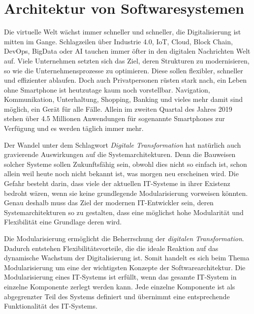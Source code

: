 \chapter{Architektur von Softwaresystemen}
\label{sec:softwarearchitektur}

Die virtuelle Welt wächst immer schneller und schneller, die Digitalisierung ist mitten im Gange. Schlagzeilen über Industrie 4.0, \ac{IoT}, Cloud, Block Chain, \ac{DevOps}, BigData oder \ac{AI} tauchen immer öfter in den digitalen Nachrichten Welt auf. Viele Unternehmen setzten sich das Ziel, deren Strukturen zu modernisieren, so wie die Unternehmensprozesse zu optimieren. Diese sollen flexibler, schneller und effizienter ablaufen. Doch auch Privatpersonen rüsten stark nach, ein Leben ohne Smartphone ist heutzutage kaum noch vorstellbar. Navigation, Kommunikation, Unterhaltung, Shopping, Banking und vieles mehr damit sind möglich, ein Gerät für alle Fälle. Allein im zweiten Quartal des Jahres 2019 stehen über 4.5 Millionen Anwendungen für sogenannte Smartphones zur Verfügung und es werden täglich immer mehr\autocite[Vgl.][]{appstore}.

Der Wandel unter dem Schlagwort \textit{Digitale Transformation} hat natürlich auch gravierende Auswirkungen auf die Systemarchitekturen. Denn die Bauweisen solcher Systeme sollen Zukunftsfähig sein, obwohl dies nicht so einfach ist, schon allein weil heute noch nicht bekannt ist, was morgen neu erscheinen wird. Die Gefahr besteht darin, dass viele der aktuellen \ac{IT}-Systeme in ihrer Existenz bedroht wären, wenn sie keine grundlegende Modularisierung vorweisen könnten. Genau deshalb muss das Ziel der modernen \ac{IT}-Entwickler sein, deren Systemarchitekturen so zu gestalten, dass eine möglichst hohe Modularität und Flexibilität eine Grundlage deren wird\autocite[Vgl.][17\psq]{gmodse}.


Die Modularisierung ermöglicht die Beherrschung der \textit{digitalen Transformation}. Dadurch entstehen Flexibilitätsvorteile, die die ideale Reaktion auf das dynamische Wachstum der Digitalisierung ist. Somit handelt es sich beim Thema Modularisierung um eine der wichtigsten Konzepte der Softwarearchitektur. Die Modularisierung eines \ac{IT}-Systems ist erfüllt, wenn das gesamte \ac{IT}-System in einzelne Komponente zerlegt werden kann. Jede einzelne Komponente ist als abgegrenzter Teil des Systems definiert und übernimmt eine entsprechende Funktionalität des \ac{IT}-Systems. 

